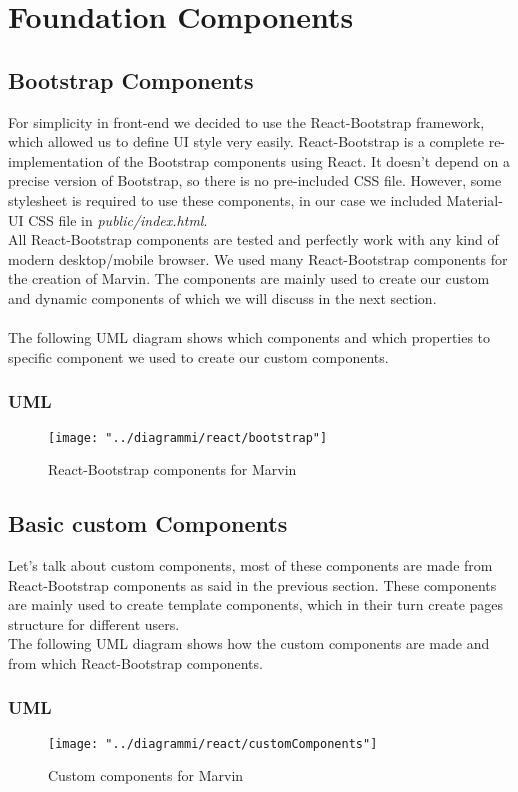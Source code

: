 \documentclass[../react]{subfiles}
\begin{document}
	
	\section{Foundation Components}

	\subsection{Bootstrap Components} For simplicity in front-end we decided to use the React-Bootstrap framework, which allowed us to define UI style very easily. React-Bootstrap is a complete re-implementation of the Bootstrap components using React. It doesn't depend on a precise version of Bootstrap, so there is no pre-included CSS file. However, some stylesheet is required to use these components, in our case we included Material-UI CSS file in \textit{public/index.html}. \\ All React-Bootstrap components are tested and perfectly work with any kind of modern desktop/mobile browser. We used many React-Bootstrap components for the creation of Marvin. The components are mainly used to create our custom and dynamic components 
	of which we will discuss in the next section. \\ \\ The following UML diagram shows which components and which properties to specific component we used to create our custom components. 
		\subsubsection{UML}
		\begin{figure}[h]
			\centering
			\texttt{[image: "../diagrammi/react/bootstrap"]}
			\caption{React-Bootstrap components for Marvin}
			\label{fig:React-Bootstrap components for Marvin}
		\end{figure}
	\newpage
	\subsection{Basic custom Components} Let's talk about custom components, most of these components are made from React-Bootstrap components as said in the previous section. These components are mainly used to create template components, which in their turn create pages structure for different users. \\The following UML diagram shows how the custom components are made and from which React-Bootstrap components.  
	\\ 
		\subsubsection{UML}
			\begin{figure}[h]
			\centering
			\texttt{[image: "../diagrammi/react/customComponents"]}
			\caption{Custom components for Marvin}
			\label{fig:Custom components for Marvin}
		\end{figure}
\end{document}
